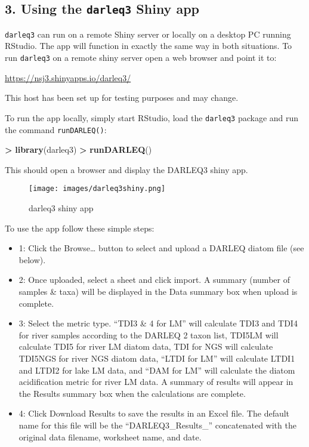 \documentclass[
]{article}
\newenvironment{Shaded}{\begin{snugshade}}{\end{snugshade}}
\newcommand{\KeywordTok}[1]{\textcolor[rgb]{0.13,0.29,0.53}{\textbf{#1}}}
\newcommand{\NormalTok}[1]{#1}
\newcommand{\OperatorTok}[1]{\textcolor[rgb]{0.81,0.36,0.00}{\textbf{#1}}}
\newcommand{\StringTok}[1]{\textcolor[rgb]{0.31,0.60,0.02}{#1}}
\begin{document}
\hypertarget{using-the-darleq3-shiny-app}{%
\subsection{\texorpdfstring{3. Using the \texttt{darleq3} Shiny
app}{3. Using the darleq3 Shiny app}}\label{using-the-darleq3-shiny-app}}

\texttt{darleq3} can run on a remote Shiny server or locally on a
desktop PC running RStudio. The app will function in exactly the same
way in both situations. To run \texttt{darleq3} on a remote shiny server
open a web browser and point it to:

\url{https://nsj3.shinyapps.io/darleq3/}

This host has been set up for testing purposes and may change.

To run the app locally, simply start RStudio, load the \texttt{darleq3}
package and run the command \texttt{runDARLEQ()}:

\begin{Shaded}
\begin{Highlighting}[]
\OperatorTok{>}\StringTok{ }\KeywordTok{library}\NormalTok{(darleq3)}
\OperatorTok{>}\StringTok{ }\KeywordTok{runDARLEQ}\NormalTok{()}
\end{Highlighting}
\end{Shaded}

This should open a browser and display the DARLEQ3 shiny app.

\begin{figure}
\centering
\texttt{[image: images/darleq3shiny.png]}
\caption{darleq3 shiny app}
\end{figure}

To use the app follow these simple steps:

\begin{itemize}
\item
  1: Click the Browse\ldots{} button to select and upload a DARLEQ
  diatom file (see below).
\item
  2: Once uploaded, select a sheet and click import. A summary (number
  of samples \& taxa) will be displayed in the Data summary box when
  upload is complete.
\item
  3: Select the metric type. ``TDI3 \& 4 for LM'' will calculate TDI3
  and TDI4 for river samples according to the DARLEQ 2 taxon list,
  TDI5LM will calculate TDI5 for river LM diatom data, TDI for NGS will
  calculate TDI5NGS for river NGS diatom data, ``LTDI for LM'' will
  calculate LTDI1 and LTDI2 for lake LM data, and ``DAM for LM'' will
  calculate the diatom acidification metric for river LM data. A summary
  of results will appear in the Results summary box when the
  calculations are complete.
\item
  4: Click Download Results to save the results in an Excel file. The
  default name for this file will be the ``DARLEQ3\_Results\_''
  concatenated with the original data filename, worksheet name, and
  date.
\end{itemize}
\end{document}
